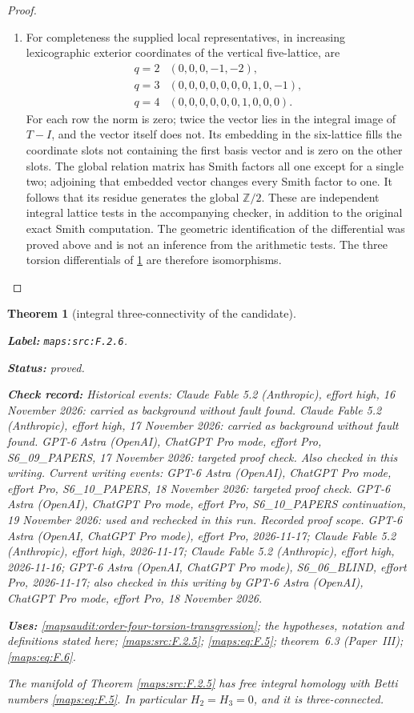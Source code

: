 \documentclass[11pt,a4paper]{article}
\newtheorem{theorem}{Theorem}[section]
\theoremstyle{definition}
\newcommand{\StatementRecord}[4]{\par\smallskip\begingroup\upshape\raggedright\noindent\textbf{Label:} \nolinkurl{#1}.\par\noindent\textbf{Status:} #2.\par\noindent\textbf{Check record:} #3.\par\noindent\textbf{Uses:} #4.\par\endgroup\smallskip}
\newcommand{\ExternalPaperRef}[3]{\ifmmode\text{\upshape #1#2 (Paper~#3)}\else #1#2 (Paper~#3)\fi}
\begin{document}
\begin{proof}
\begin{enumerate}[label=\arabic*.]
\item For completeness the supplied local representatives, in increasing
lexicographic exterior coordinates of the vertical five-lattice, are
\[
\begin{array}{c|l}
q=2&(0,0,0,-1,-2),\\
q=3&(0,0,0,0,0,0,0,1,0,-1),\\
q=4&(0,0,0,0,0,0,1,0,0,0).
\end{array}
\]
For each row the norm is zero; twice the vector lies in the integral
image of $T-I$, and the vector itself does not. Its embedding in
the six-lattice fills the coordinate slots not containing the first
basis vector and is zero on the other slots. The global relation
matrix has Smith factors all one except for a single two; adjoining
that embedded vector changes every Smith factor to one. It follows
that its residue generates the global $\mathbb Z/2$. These are
independent integral lattice tests in the accompanying checker, in
addition to the original exact Smith computation. The geometric
identification of the differential was proved above and is not an
inference from the arithmetic tests. The three torsion differentials
of \ref{maps:src:F.2.6} are therefore isomorphisms.

\end{enumerate}
\end{proof}




\begin{theorem}[integral three-connectivity of the candidate]\label{maps:src:F.2.6}
\StatementRecord{maps:src:F.2.6}{proved}{Historical events: Claude Fable 5.2 (Anthropic), effort high, 16 November 2026: carried as background without fault found. Claude Fable 5.2 (Anthropic), effort high, 17 November 2026: carried as background without fault found. GPT-6 Astra (OpenAI), ChatGPT Pro mode, effort Pro, S6\_09\_PAPERS, 17 November 2026: targeted proof check. Also checked in this writing. Current writing events: GPT-6 Astra (OpenAI), ChatGPT Pro mode, effort Pro, S6\_10\_PAPERS, 18 November 2026: targeted proof check. GPT-6 Astra (OpenAI), ChatGPT Pro mode, effort Pro, S6\_10\_PAPERS continuation, 19 November 2026: used and rechecked in this run. \emph{Recorded proof scope.} GPT-6 Astra (OpenAI, ChatGPT Pro mode), effort Pro, 2026-11-17; Claude Fable 5.2 (Anthropic), effort high, 2026-11-17; Claude Fable 5.2 (Anthropic), effort high, 2026-11-16; GPT-6 Astra (OpenAI, ChatGPT Pro mode), S6\_06\_BLIND, effort Pro, 2026-11-17; also checked in this writing by GPT-6 Astra (OpenAI), ChatGPT Pro mode, effort Pro, 18 November 2026}{\cref{mapsaudit:order-four-torsion-transgression}; the hypotheses, notation and definitions stated here; \cref{maps:src:F.2.5}; \cref{maps:eq:F.5}; \ExternalPaperRef{theorem~}{6.3}{III}; \cref{maps:eq:F.6}}


The manifold of Theorem \ref{maps:src:F.2.5} has free integral homology with
Betti numbers \eqref{maps:eq:F.5}.  In particular $H_2=H_3=0$, and it is
three-connected.

\end{theorem}
\end{document}
